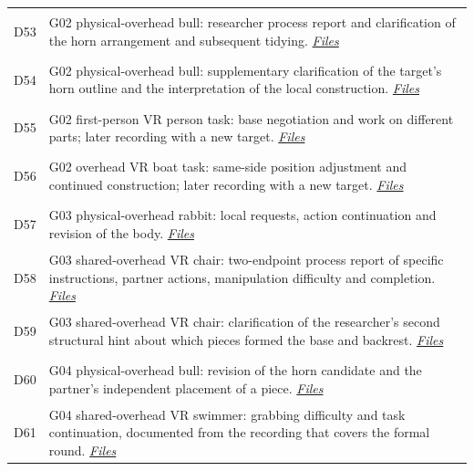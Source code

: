 \begin{longtable}{@{}p{14mm}>{\raggedright\arraybackslash}p{140mm}@{}}
\hypertarget{src:D53}{}\label{src:D53}D53 & G02 physical-overhead bull: researcher process report and clarification of the horn arrangement and subsequent tidying. \href{https://github.com/YiyangQin-UQ/REIT7841/blob/main/thesis/v1.1/materials/README.md\#d53}{\textit{Files}} \\
\hypertarget{src:D54}{}\label{src:D54}D54 & G02 physical-overhead bull: supplementary clarification of the target's horn outline and the interpretation of the local construction. \href{https://github.com/YiyangQin-UQ/REIT7841/blob/main/thesis/v1.1/materials/README.md\#d54}{\textit{Files}} \\
\hypertarget{src:D55}{}\label{src:D55}D55 & G02 first-person VR person task: base negotiation and work on different parts; later recording with a new target. \href{https://github.com/YiyangQin-UQ/REIT7841/blob/main/thesis/v1.1/materials/README.md\#d55}{\textit{Files}} \\
\hypertarget{src:D56}{}\label{src:D56}D56 & G02 overhead VR boat task: same-side position adjustment and continued construction; later recording with a new target. \href{https://github.com/YiyangQin-UQ/REIT7841/blob/main/thesis/v1.1/materials/README.md\#d56}{\textit{Files}} \\
\hypertarget{src:D57}{}\label{src:D57}D57 & G03 physical-overhead rabbit: local requests, action continuation and revision of the body. \href{https://github.com/YiyangQin-UQ/REIT7841/blob/main/thesis/v1.1/materials/README.md\#d57}{\textit{Files}} \\
\hypertarget{src:D58}{}\label{src:D58}D58 & G03 shared-overhead VR chair: two-endpoint process report of specific instructions, partner actions, manipulation difficulty and completion. \href{https://github.com/YiyangQin-UQ/REIT7841/blob/main/thesis/v1.1/materials/README.md\#d58}{\textit{Files}} \\
\hypertarget{src:D59}{}\label{src:D59}D59 & G03 shared-overhead VR chair: clarification of the researcher's second structural hint about which pieces formed the base and backrest. \href{https://github.com/YiyangQin-UQ/REIT7841/blob/main/thesis/v1.1/materials/README.md\#d59}{\textit{Files}} \\
\hypertarget{src:D60}{}\label{src:D60}D60 & G04 physical-overhead bull: revision of the horn candidate and the partner's independent placement of a piece. \href{https://github.com/YiyangQin-UQ/REIT7841/blob/main/thesis/v1.1/materials/README.md\#d60}{\textit{Files}} \\
\hypertarget{src:D61}{}\label{src:D61}D61 & G04 shared-overhead VR swimmer: grabbing difficulty and task continuation, documented from the recording that covers the formal round. \href{https://github.com/YiyangQin-UQ/REIT7841/blob/main/thesis/v1.1/materials/README.md\#d61}{\textit{Files}} \\

\end{longtable}
